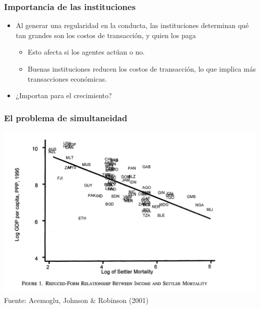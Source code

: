 \documentclass{beamer}
\begin{document}
\begin{frame}
\frametitle{Importancia de las instituciones}
\begin{itemize}
    \item Al generar una regularidad en la conducta, las instituciones determinan qué tan grandes son los costos de transacción, y quien los paga\vspace{2mm}
    \begin{itemize}
        \item Esto afecta si los agentes actúan o no.\vspace{2mm}
        \item Buenas instituciones reducen los costos de transacción, lo que implica más transacciones económicas.\vspace{4mm}
    \end{itemize}
    \item ¿Importan para el crecimiento?
\end{itemize}
\end{frame}

\begin{frame}
\frametitle{El problema de simultaneidad}
\centering
\includegraphics[scale=0.35]{Slides Principios de Economia/Figures/Tema_04.1_examples2.png}
    \small Fuente: Acemoglu, Johnson & Robinson (2001)
\end{frame}
\end{document}
